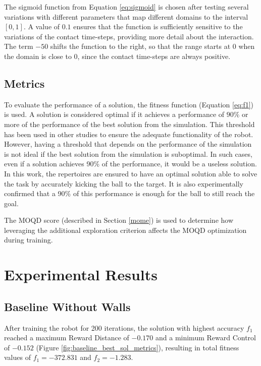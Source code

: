\documentclass[12pt]{article}
\begin{document}
The sigmoid function from Equation \ref{eq:sigmoid} is chosen after testing several variations with different parameters that map different domains to the interval \([0, 1]\). A value of \(0.1\) ensures that the function is sufficiently sensitive to the variations of the contact time-steps, providing more detail about the interaction. The term \(-50\) shifts the function to the right, so that the range starts at 0 when the domain is close to 0, since the contact time-steps are always positive.

\subsection{Metrics} \label{metrics}

To evaluate the performance of a solution, the fitness function (Equation \ref{eq:f1}) is used. A solution is considered optimal if it achieves a performance of $90\%$ or more of the performance of the best solution from the simulation. This threshold has been used in other studies \citep{cully2015robots} to ensure the adequate functionality of the robot. However, having a threshold that depends on the performance of the simulation is not ideal if the best solution from the simulation is suboptimal. In such cases, even if a solution achieves 90\% of the performance, it would be a useless solution. In this work, the repertoires are ensured to have an optimal solution able to solve the task by accurately kicking the ball to the target. It is also experimentally confirmed that a 90\% of this performance is enough for the ball to still reach the goal. 

The MOQD score (described in Section \ref{mome}) is used to determine how leveraging the additional exploration criterion affects the MOQD optimization during training.

\section{Experimental Results} \label{results} 

\subsection{Baseline Without Walls}

After training the robot for 200 iterations, the solution with highest accuracy $f_1$ reached a maximum Reward Distance of $-0.170$ and a minimum Reward Control of $-0.152$ (Figure \ref{fig:baseline_best_sol_metrics}), resulting in total fitness values of $f_1=-372.831$ and $f_2=-1.283$. 
\end{document}
